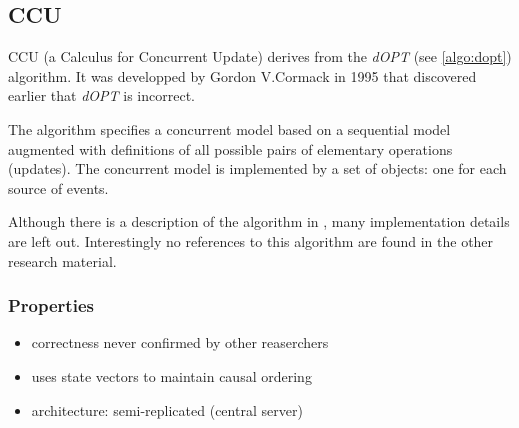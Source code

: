 \subsection{CCU}
\label{algo:ccu}

CCU (a Calculus for Concurrent Update) derives from the \emph{dOPT} (see \ref{algo:dopt}) algorithm. It was developped by Gordon V.Cormack in 1995 that discovered earlier \cite{cormack95a} that \emph{dOPT} is incorrect. 

The algorithm specifies a concurrent model based on a sequential model augmented with definitions of all possible pairs of elementary operations (updates). The concurrent model is implemented by a set of objects: one for each source of events.

Although there is a description of the algorithm in \cite{cormack95b}, many implementation details are left out. Interestingly no references to this algorithm are found in the other research material. 

\subsubsection{Properties}
\begin{itemize}
 \item correctness never confirmed by other reaserchers
 \item uses state vectors to maintain causal ordering
 \item architecture: semi-replicated (central server)
\end{itemize}

